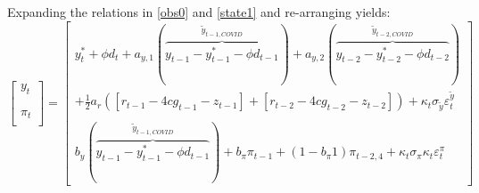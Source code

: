 \documentclass[a4paper,12pt]{article}
\begin{document}
\pagebreak

Expanding the relations in \ref{obs0} and \ref{state1} and re-arranging
yields:%
\begin{equation}
\begin{bmatrix}
y_{t} \\ 
\\ 
\\ 
\pi _{t} \\ 
\end{bmatrix}%
=%
\begin{bmatrix}
y_{t}^{\ast }+\phi d_{t}+a_{y,1}(\overbrace{y_{t-1}-y_{t-1}^{\ast }-\phi
d_{t-1}}^{\tilde{y}_{t-1,COVID}})+a_{y,2}(\overbrace{y_{t-2}-y_{t-2}^{\ast
}-\phi d_{t-2}}^{\tilde{y}_{t-2,COVID}}) \\ 
+\frac{1}{2}a_{r}\left( \left[ r_{t-1}-4cg_{t-1}-z_{t-1}\right] +\left[
r_{t-2}-4cg_{t-2}-z_{t-2}\right] \right) +\kappa _{t}\sigma _{\tilde{y}%
}\varepsilon _{t}^{\tilde{y}} \\ 
\\[-5mm] 
b_{y}(\overbrace{y_{t-1}-y_{t-1}^{\ast }-\phi d_{t-1}}^{\tilde{y}%
_{t-1,COVID}})+b_{\pi }\pi _{t-1}+\left( 1-b_{\pi }1\right) \pi
_{t-2,4}+\kappa _{t}\sigma _{\pi }\kappa _{t}\varepsilon _{t}^{\pi }%
\end{bmatrix}
\label{lwa}
\end{equation}
\end{document}
